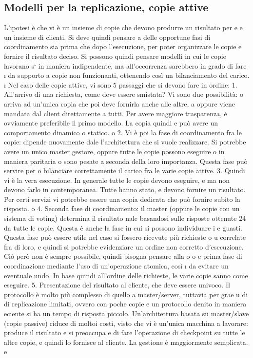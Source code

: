 \subsection{Modelli per la replicazione, copie attive}
L'ipotesi è che vi è un insieme di copie che devono produrre un risultato per
e
e
un insieme di clienti. Si deve quindi pensare a delle opportune fasi di coordinamento sia prima che dopo l'esecuzione,
per poter organizzare le copie e
fornire il risultato deciso. Si possono quindi pensare modelli in cui le copie lavorano s` in maniera indipendente, ma
all'occorrenza sarebbero in grado di fare
\i{}
da supporto a copie non funzionanti, ottenendo così un bilanciamento del carico.
\i{}
Nel caso delle copie attive, vi sono 5 passaggi che si devono fare in ordine:
1. All'arrivo di una richiesta, come deve essere smistata? Vi sono due possibilità: o arriva ad un'unica copia che poi
deve fornirla anche alle altre,
a
oppure viene mandata dal client direttamente a tutti. Per avere maggiore
trasparenza, è ovviamente preferibile il primo modello. La copia quindi
e
può avere un comportamento dinamico o statico.
o
2. Vi è poi la fase di coordinamento fra le copie: dipende nuovamente dale
l'architettura che si vuole realizzare. Si potrebbe avere un unico master
gestore, oppure tutte le copie possono eseguire o in maniera paritaria o
sono pesate a seconda della loro importanza. Questa fase può servire per
o
bilanciare correttamente il carico fra le varie copie attive.
3. Quindi vi è la vera esecuzione. In generale tutte le copie devono eseguire,
e
ma non devono farlo in contemporanea. Tutte hanno stato, e devono
fornire un risultato. Per certi servizi vi potrebbe essere una copia dedicata
che può fornire subito la risposta.
o
4. Seconda fase di coordinamento: il master (oppure le copie con un sistema
di voting) determina il risultato nale basandosi sulle risposte ottenute
24
da tutte le copie. Questa è anche la fase in cui si possono individuare i
e
guasti. Questa fase può essere utile nel caso si fossero ricevute più richieste
o
u
correlate fra di loro, e quindi si potrebbe evidenziare un ordine non corretto
d'esecuzione. Ciò però non è sempre possibile, quindi bisogna pensare alla
o
o
e
prima fase di coordinazione mediante l'uso di un'operazione atomica, così
\i{}
da evitare un eventuale undo. In base quindi all'ordine delle richieste, le
varie copie sanno come eseguire.
5. Presentazione del risultato al cliente, che deve essere univoco.
Il protocollo è molto più complesso di quello a master/server, tuttavia per grae
u
di di replicazione limitati, ovvero con poche copie e un protocollo denito in
maniera eciente si ha un tempo di risposta piccolo.
Un'architettura basata su master/slave (copie passive) riduce di moltoi costi,
visto che vi è un'unica macchina a lavorare: produce il risultato e si preoccupa
e
di fare l'operazione di checkpoint su tutte le altre copie, e quindi lo fornisce al
cliente. La gestione è maggiormente semplicata.
e

